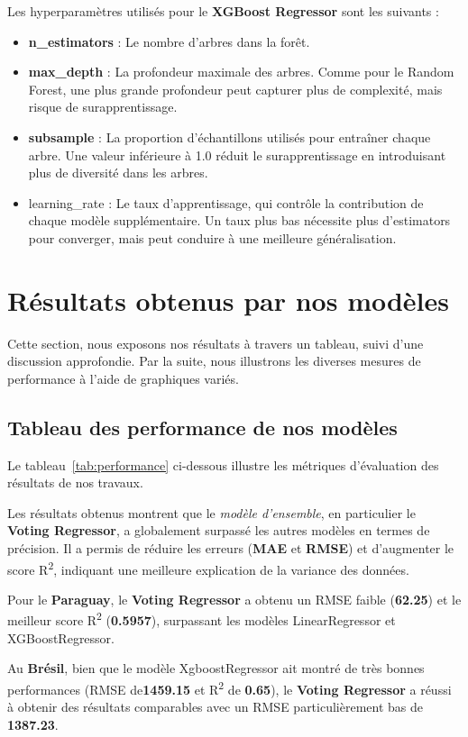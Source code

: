 Les hyperparamètres utilisés pour le \textbf{XGBoost Regressor} sont les suivants :
\begin{itemize}
	\item \textbf{n\_estimators} : Le nombre d'arbres dans la forêt.
	\item \textbf{max\_depth} : La profondeur maximale des arbres. Comme pour le Random Forest, une plus grande profondeur peut capturer plus de complexité, mais risque de surapprentissage.
	\item \textbf{subsample} : La proportion d'échantillons utilisés pour entraîner chaque arbre. Une valeur inférieure à 1.0 réduit le surapprentissage en introduisant plus de diversité dans les arbres.
	\item \textsf{learning\_rate} : Le taux d'apprentissage, qui contrôle la contribution de chaque modèle supplémentaire. Un taux plus bas nécessite plus d'estimators pour converger, mais peut conduire à une meilleure généralisation.
\end{itemize}

\section{Résultats obtenus par nos modèles}
Cette section, nous exposons nos résultats à travers un tableau, suivi d’une discussion approfondie. Par la suite, nous illustrons les diverses mesures de performance à l’aide de graphiques variés.
\subsection{Tableau des performance de nos modèles}
Le tableau~\ref{tab:performance} ci-dessous illustre les métriques d’évaluation des résultats de nos travaux.

Les résultats obtenus montrent que le \textit{modèle d'ensemble}, en particulier le \textbf{Voting Regressor}, a globalement surpassé les autres modèles en termes de précision. Il a permis de réduire les erreurs (\textbf{MAE} et \textbf{RMSE}) et d'augmenter le score R\textsuperscript{2}, indiquant une meilleure explication de la variance des données.

Pour le \textbf{Paraguay}, le \textbf{Voting Regressor} a obtenu un RMSE  faible (\textbf{62.25}) et le meilleur score R\textsuperscript{2} (\textbf{0.5957}), surpassant les modèles LinearRegressor et XGBoostRegressor.

Au \textbf{Brésil}, bien que le modèle XgboostRegressor ait montré de très bonnes performances (RMSE de\textbf{1459.15} et R\textsuperscript{2} de \textbf{0.65}), le \textbf{Voting Regressor} a réussi à obtenir des résultats comparables avec un RMSE particulièrement bas de \textbf{1387.23}.

